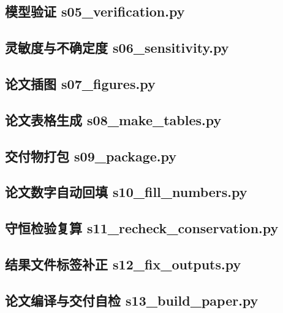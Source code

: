 \subsection{模型验证 s05\_verification.py}


\subsection{灵敏度与不确定度 s06\_sensitivity.py}


\subsection{论文插图 s07\_figures.py}


\subsection{论文表格生成 s08\_make\_tables.py}


\subsection{交付物打包 s09\_package.py}


\subsection{论文数字自动回填 s10\_fill\_numbers.py}


\subsection{守恒检验复算 s11\_recheck\_conservation.py}


\subsection{结果文件标签补正 s12\_fix\_outputs.py}


\subsection{论文编译与交付自检 s13\_build\_paper.py}


